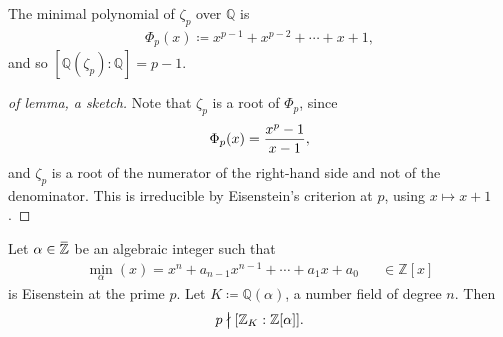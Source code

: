 \begin{lemma}

The minimal polynomial of \(\zeta_p\) over \({\mathbb{Q}}\) is
\begin{align*}
\Phi_p(x) \coloneqq x^{p-1} + x^{p-2} + \cdots + x + 1
,\end{align*}
and so \([{\mathbb{Q}}(\zeta_p) : {\mathbb{Q}}] = p-1\).

\end{lemma}

\begin{proof}[of lemma, a sketch]

Note that \(\zeta_p\) is a root of \(\Phi_p\), since
\begin{align*}
\Phi_p(x) = {x^p-1 \over x - 1}
,\end{align*}
and \(\zeta_p\) is a root of the numerator of the right-hand side and
not of the denominator. This is irreducible by Eisenstein's criterion at
\(p\), using \(x\mapsto x+1\).

\end{proof}

\begin{proposition}

Let
\(\alpha\in \mkern 1.5mu\overline{\mkern-1.5mu{\mathbb{Z}}\mkern-1.5mu}\mkern 1.5mu\)
be an algebraic integer such that
\begin{align*}
\min_ \alpha (x) = x^n + a_{n-1}x^{n-1} + \cdots + a_1x + a_0 && \in {\mathbb{Z}}[x]
\end{align*}
is Eisenstein at the prime \(p\). Let
\(K \coloneqq{\mathbb{Q}}( \alpha)\), a number field of degree \(n\).
Then
\begin{align*}
p%
  \mathrel{\mkern.5mu %
    \ooalign{\hidewidth$\big|$\hidewidth\cr$\nmid$\cr}%
  }%
[{\mathbb{Z}}_K : {\mathbb{Z}}[ \alpha] ]
.\end{align*}

\end{proposition}

